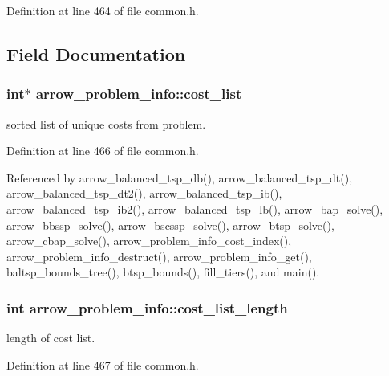 Definition at line 464 of file common.h.

\subsection{Field Documentation}
\hypertarget{structarrow__problem__info_7c9472312d7057fb9d74eb5579930216}{
\subsubsection[{cost\_\-list}]{\setlength{\rightskip}{0pt plus 5cm}int$\ast$ {\bf arrow\_\-problem\_\-info::cost\_\-list}}}
\label{structarrow__problem__info_7c9472312d7057fb9d74eb5579930216}


sorted list of unique costs from problem. 

Definition at line 466 of file common.h.

Referenced by arrow\_\-balanced\_\-tsp\_\-db(), arrow\_\-balanced\_\-tsp\_\-dt(), arrow\_\-balanced\_\-tsp\_\-dt2(), arrow\_\-balanced\_\-tsp\_\-ib(), arrow\_\-balanced\_\-tsp\_\-ib2(), arrow\_\-balanced\_\-tsp\_\-lb(), arrow\_\-bap\_\-solve(), arrow\_\-bbssp\_\-solve(), arrow\_\-bscssp\_\-solve(), arrow\_\-btsp\_\-solve(), arrow\_\-cbap\_\-solve(), arrow\_\-problem\_\-info\_\-cost\_\-index(), arrow\_\-problem\_\-info\_\-destruct(), arrow\_\-problem\_\-info\_\-get(), baltsp\_\-bounds\_\-tree(), btsp\_\-bounds(), fill\_\-tiers(), and main().\hypertarget{structarrow__problem__info_54bbdc187af19361072480b45016f171}{
\subsubsection[{cost\_\-list\_\-length}]{\setlength{\rightskip}{0pt plus 5cm}int {\bf arrow\_\-problem\_\-info::cost\_\-list\_\-length}}}
\label{structarrow__problem__info_54bbdc187af19361072480b45016f171}


length of cost list. 

Definition at line 467 of file common.h.


